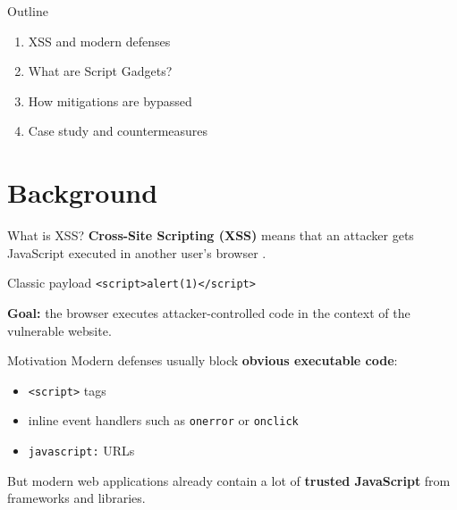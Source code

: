 \documentclass[%
font=nexus,
aspectratio=169,
language=english
]{tubsCD/tubscd}
\begin{document}

\begin{frame}[plain]
\titlepage
\end{frame}


\begin{frame}{Outline}
\begin{enumerate}
\item XSS and modern defenses
\item What are Script Gadgets?
\item How mitigations are bypassed
\item Case study and countermeasures
\end{enumerate}
\end{frame}


\section{Background}

\begin{frame}{What is XSS?}
\textbf{Cross-Site Scripting (XSS)} means that an attacker gets JavaScript executed in another user's browser \citep{lekies2017scriptgadgets}.

\vspace{0.7em}

\begin{exampleblock}{Classic payload}
\texttt{<script>alert(1)</script>}
\end{exampleblock}

\vspace{0.7em}

\textbf{Goal:} the browser executes attacker-controlled code in the context of the vulnerable website.
\end{frame}

\begin{frame}{Motivation}
Modern defenses usually block \textbf{obvious executable code}:

\vspace{0.5em}

\begin{itemize}
\item \texttt{<script>} tags
\item inline event handlers such as \texttt{onerror} or \texttt{onclick}
\item \texttt{javascript:} URLs
\end{itemize}

\vspace{0.7em}

But modern web applications already contain a lot of \textbf{trusted JavaScript} from frameworks and libraries.
\end{frame}
\end{document}
